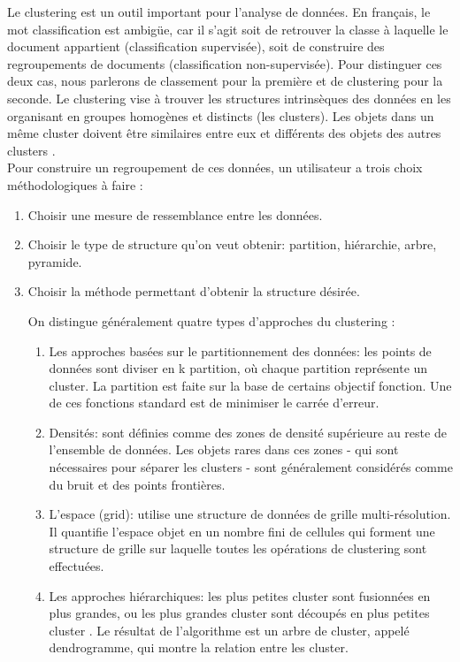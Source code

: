 \documentclass[12pt]{article}
\begin{document}
Le clustering est un outil important pour l'analyse de données. En français, le mot classification est ambigüe, car il s'agit soit de retrouver la classe à laquelle le document appartient (classification supervisée), soit de construire des regroupements de documents (classification non-supervisée). Pour distinguer ces deux cas, nous parlerons de classement pour la première et de clustering pour la seconde. Le clustering vise à trouver les structures intrinsèques des données en les organisant en groupes homogènes et distincts (les clusters). Les objets dans un même cluster doivent être similaires entre eux et différents des objets des autres clusters \cite{3}.\\
Pour construire un regroupement de ces données, un utilisateur a trois choix méthodologiques à faire :
\begin{enumerate}
	\item Choisir une mesure de ressemblance entre les données.
	\item Choisir le type de structure qu'on veut obtenir: partition, hiérarchie, arbre, pyramide.
	\item Choisir la méthode permettant d'obtenir la structure désirée.
	
On distingue généralement quatre types d'approches du clustering \cite{4}:
	\begin{enumerate}
	\item Les approches basées sur le partitionnement des données: les points de données sont diviser en k partition, où chaque partition représente un cluster. La partition est faite sur la base de certains objectif fonction. Une de ces fonctions standard est de minimiser le carrée d’erreur.
	\item Densités: sont définies comme des zones de densité supérieure au reste de l’ensemble de données. Les objets rares dans ces zones - qui sont nécessaires pour séparer les clusters - sont généralement considérés comme du bruit et des points frontières.	
	\item L'espace (grid): utilise une structure de données de grille multi-résolution. Il quantifie l'espace objet en un nombre fini de cellules qui forment une structure de grille sur laquelle toutes les opérations de clustering sont effectuées.
	\item Les approches hiérarchiques: les plus petites cluster sont fusionnées en plus grandes, ou les plus grandes cluster sont découpés en plus petites cluster . Le résultat de l'algorithme est un arbre de cluster, appelé dendrogramme, qui montre la relation entre les cluster.
	

\end{enumerate}
\end{enumerate}
\end{document}
